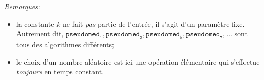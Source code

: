 \documentclass{article}
\begin{document}
\vspace*{8pt}

{\small
\emph{Remarques}:\medskip
\begin{itemize}
  \setlength\itemsep{8pt}
  
\item la constante $k$ ne fait \emph{pas} partie de l'entrée, il
  s'agit d'un paramètre fixe. Autrement dit,
  $\texttt{pseudomed}_1, \allowbreak \texttt{pseudomed}_3, \allowbreak \texttt{pseudomed}_5, \texttt{pseudomed}_7, \ldots$
  sont tous des algorithmes différents;

\item le choix d'un nombre aléatoire est ici une
  opération élémentaire qui s'effectue \emph{toujours} en temps
  constant.
\end{itemize}
}

\pagebreak
\end{document}
